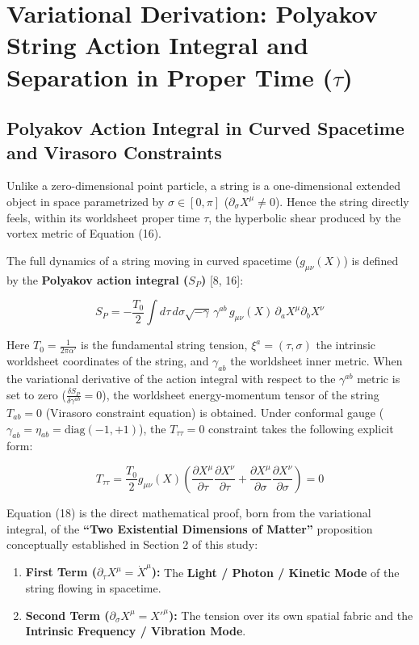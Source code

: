 \documentclass[12pt,a4paper]{article}
\begin{document}
\section{Variational Derivation: Polyakov String Action Integral and Separation in Proper Time ($\tau$)}

\subsection{Polyakov Action Integral in Curved Spacetime and Virasoro Constraints}

Unlike a zero-dimensional point particle, a string is a one-dimensional extended object in space parametrized by $\sigma \in [0, \pi]$ ($\partial_\sigma X^\mu \neq 0$). Hence the string directly feels, within its worldsheet proper time $\tau$, the hyperbolic shear produced by the vortex metric of Equation (16).

The full dynamics of a string moving in curved spacetime ($g_{\mu\nu}(X)$) is defined by the \textbf{Polyakov action integral ($S_P$)} [8, 16]:

\begin{equation}
S_P = -\frac{T_0}{2} \int d\tau \, d\sigma \sqrt{-\gamma} \, \gamma^{ab} \, g_{\mu\nu}(X) \, \partial_a X^\mu \partial_b X^\nu
\end{equation}

Here $T_0 = \frac{1}{2\pi\alpha'}$ is the fundamental string tension, $\xi^a = (\tau, \sigma)$ the intrinsic worldsheet coordinates of the string, and $\gamma_{ab}$ the worldsheet inner metric. When the variational derivative of the action integral with respect to the $\gamma^{ab}$ metric is set to zero ($\frac{\delta S_P}{\delta \gamma^{ab}} = 0$), the worldsheet energy-momentum tensor of the string $T_{ab} = 0$ (Virasoro constraint equation) is obtained. Under conformal gauge ($\gamma_{ab} = \eta_{ab} = \text{diag}(-1, +1)$), the $T_{\tau\tau} = 0$ constraint takes the following explicit form:

\begin{equation}
T_{\tau\tau} = \frac{T_0}{2} g_{\mu\nu}(X) \left( \frac{\partial X^\mu}{\partial \tau} \frac{\partial X^\nu}{\partial \tau} + \frac{\partial X^\mu}{\partial \sigma} \frac{\partial X^\nu}{\partial \sigma} \right) = 0
\end{equation}

Equation (18) is the direct mathematical proof, born from the variational integral, of the \textbf{``Two Existential Dimensions of Matter''} proposition conceptually established in Section 2 of this study:
\begin{enumerate}
    \item \textbf{First Term ($\partial_\tau X^\mu = \dot{X}^\mu$):} The \textbf{Light / Photon / Kinetic Mode} of the string flowing in spacetime.
    \item \textbf{Second Term ($\partial_\sigma X^\mu = X'^\mu$):} The tension over its own spatial fabric and the \textbf{Intrinsic Frequency / Vibration Mode}.
\end{enumerate}
\end{document}
